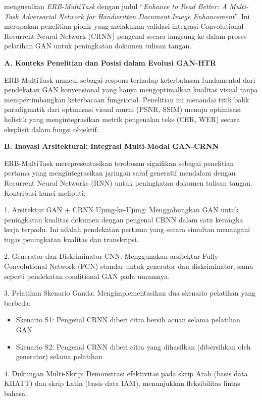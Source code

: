 \citep{erb2021} \cite{erb2021} mengusulkan \textit{ERB-MultiTask} dengan judul ``\textit{Enhance to Read Better: A Multi-Task Adversarial Network for Handwritten Document Image Enhancement}''. Ini merupakan penelitian pionir yang melakukan validasi integrasi Convolutional Recurrent Neural Network (CRNN) pengenal secara langsung ke dalam proses pelatihan GAN untuk peningkatan dokumen tulisan tangan.

\noindent\textbf{A. Konteks Penelitian dan Posisi dalam Evolusi GAN-HTR}

ERB-MultiTask muncul sebagai respons terhadap keterbatasan fundamental dari pendekatan GAN konvensional yang hanya mengoptimalkan kualitas visual tanpa mempertimbangkan keterbacaan fungsional. Penelitian ini menandai titik balik paradigmatik dari optimisasi visual murni (PSNR, SSIM) menuju optimisasi holistik yang mengintegrasikan metrik pengenalan teks (CER, WER) secara eksplisit dalam fungsi objektif.

\noindent\textbf{B. Inovasi Arsitektural: Integrasi Multi-Modal GAN-CRNN}

ERB-MultiTask merepresentasikan terobosan signifikan sebagai penelitian pertama yang mengintegrasikan jaringan saraf generatif mendalam dengan Recurrent Neural Networks (RNN) untuk peningkatan dokumen tulisan tangan. Kontribusi kunci meliputi:

1. Arsitektur GAN + CRNN Ujung-ke-Ujung: Menggabungkan GAN untuk peningkatan kualitas dokumen dengan pengenal CRNN dalam satu kerangka kerja terpadu. Ini adalah pendekatan pertama yang secara simultan menangani tugas peningkatan kualitas dan transkripsi.

2. Generator dan Diskriminator CNN: Menggunakan arsitektur Fully Convolutional Network (FCN) standar untuk generator dan diskriminator, sama seperti pendekatan conditional GAN pada umumnya.

3. Pelatihan Skenario Ganda: Mengimplementasikan dua skenario pelatihan yang berbeda:
\begin{itemize}
 \item Skenario S1: Pengenal CRNN diberi citra bersih acuan selama pelatihan GAN
 \item Skenario S2: Pengenal CRNN diberi citra yang dihasilkan (dibersihkan oleh generator) selama pelatihan
\end{itemize}

4. Dukungan Multi-Skrip: Demonstrasi efektivitas pada skrip Arab (basis data KHATT) dan skrip Latin (basis data IAM), menunjukkan fleksibilitas lintas bahasa.

